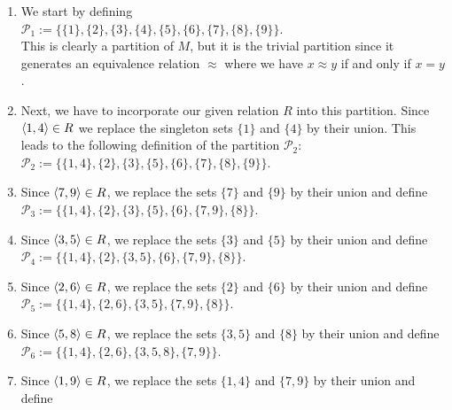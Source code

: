 \begin{enumerate}
\item We start by defining
      \\[0.2cm]
      \hspace*{1.3cm}
      $\mathcal{P}_1 := \bigl\{ \{1\}, \{2\}, \{3\}, \{4\}, \{5\}, \{6\}, \{7\}, \{8\}, \{9\} \bigr\}$.
      \\[0.2cm]
      This is clearly a partition of $M$, but it is the trivial partition since it generates an equivalence
      relation $\approx$ where we have  $x \approx y$ if and only if $x = y$.  
\item Next, we have to incorporate our given relation $R$ into this partition.  Since $\pair(1,4) \in R$
      we replace the singleton sets $\{1\}$ and $\{4\}$ by their union.  This leads to the following
      definition of the partition $\mathcal{P}_2$:
      \\[0.2cm]
      \hspace*{1.3cm}
      $\mathcal{P}_2 := \bigl\{ \{1, 4\}, \{2\}, \{3\}, \{5\}, \{6\}, \{7\}, \{8\}, \{9\} \bigr\}$.
\item Since $\pair(7,9) \in R$, we replace the sets $\{7\}$ and $\{9\}$ by their union and define
      \\[0.2cm]
      \hspace*{1.3cm}
      $\mathcal{P}_3 := \bigl\{ \{1, 4\}, \{2\}, \{3\}, \{5\}, \{6\}, \{7, 9\}, \{8\} \bigr\}$.
\item Since $\pair(3,5) \in R$, we replace the sets $\{3\}$ and $\{5\}$ by their union and define
      \\[0.2cm]
      \hspace*{1.3cm}
      $\mathcal{P}_4 := \bigl\{ \{1, 4\}, \{2\}, \{3,5\}, \{6\}, \{7, 9\}, \{8\} \bigr\}$.
\item Since $\pair(2,6) \in R$, we replace the sets $\{2\}$ and $\{6\}$ by their union and define
      \\[0.2cm]
      \hspace*{1.3cm}
      $\mathcal{P}_5 := \bigl\{ \{1, 4\}, \{2,6\}, \{3,5\}, \{7, 9\}, \{8\} \bigr\}$.
\item Since $\pair(5,8) \in R$, we replace the sets $\{3,5\}$ and $\{8\}$ by their union and define
      \\[0.2cm]
      \hspace*{1.3cm}
      $\mathcal{P}_6 := \bigl\{ \{1, 4\}, \{2,6\}, \{3,5,8\}, \{7, 9\} \bigr\}$.
\item Since $\pair(1,9) \in R$, we replace the sets $\{1,4\}$ and $\{7,9\}$ by their union and define

\end{enumerate}
